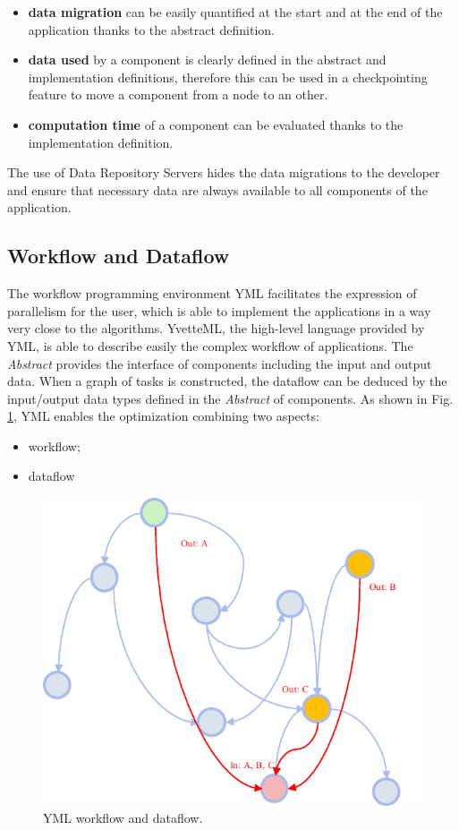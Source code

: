 \begin{itemize}
	\item \textbf{data migration} can be easily quantified at the start and at the end of the application thanks to the abstract definition.
	\item \textbf{data used} by a component is clearly defined in the abstract and implementation definitions, therefore this can be used in a checkpointing feature to move a component from a node to an other.
	\item \textbf{computation time} of a component can be evaluated thanks to the implementation definition.
\end{itemize}

The use of Data Repository Servers hides the data migrations to the developer and ensure that necessary data are always available to all components of the application.

\subsection{Workflow and Dataflow}

The workflow programming environment YML facilitates the expression of parallelism for the user, which is able to implement the applications in a way very close to the algorithms. YvetteML, the high-level language provided by YML, is able to describe easily the complex workflow of applications. The \textit{Abstract} provides the interface of components including the input and output data. When a graph of tasks is constructed, the dataflow can be deduced by the input/output data types defined in the \textit{Abstract} of components. As shown in Fig. \ref{fig:yml-dataflow}, YML enables the optimization combining two aspects:

\begin{itemize}
	\item workflow;
	\item dataflow
\end{itemize}

\begin{figure}[htbp]
	\centering
	\includegraphics[width=.72\linewidth]{fig/dataflow.pdf}
	\caption{YML workflow and dataflow.}
	\label{fig:yml-dataflow}
\end{figure}

